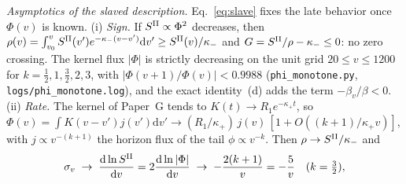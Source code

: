 \documentclass[11pt]{article}
\begin{document}
\emph{Asymptotics of the slaved description.} Eq.~\eqref{eq:slave} fixes the late behavior once $\Phi(v)$ is known. (i) \emph{Sign.} If $S^{\rm II}\propto\Phi^{2}$ decreases, then $\rho(v)=\int_{v_0}^{v}S^{\rm II}(v')e^{-\kappa_-(v-v')}\mathrm{d}v'\ge S^{\rm II}(v)/\kappa_-$ and $G=S^{\rm II}/\rho-\kappa_-\le0$: no zero crossing. The kernel flux $|\Phi|$ is strictly decreasing on the unit grid $20\le v\le1200$ for $k=\tfrac12,1,\tfrac32,2,3$, with $|\Phi(v+1)/\Phi(v)|<0.9988$ (\texttt{phi\_monotone.py}, \texttt{logs/phi\_monotone.log}), and the exact identity~(d) adds the term $-\beta_v/\beta<0$. (ii) \emph{Rate.} The kernel of Paper~G tends to $K(t)\to R_1e^{-\kappa_+t}$, so $\Phi(v)=\int K(v-v')j(v')\mathrm{d}v'\to(R_1/\kappa_+)\,j(v)\,[1+O((k+1)/\kappa_+v)]$, with $j\propto v^{-(k+1)}$ the horizon flux of the tail $\phi\propto v^{-k}$. Then $\rho\to S^{\rm II}/\kappa_-$ and
\begin{equation}
\sigma_v\;\to\;\frac{\mathrm{d}\ln S^{\rm II}}{\mathrm{d}v}=2\frac{\mathrm{d}\ln|\Phi|}{\mathrm{d}v}\;\to\;-\frac{2(k+1)}{v}=-\frac5v\quad(k=\tfrac32),
\label{eq:asym}
\end{equation}
\end{document}
